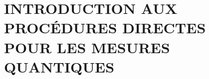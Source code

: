 \documentclass[superscriptaddress,12pt]{article}
\begin{document}
    \section{INTRODUCTION AUX PROCÉDURES DIRECTES POUR LES MESURES QUANTIQUES}
    
    
    

    
\end{document}
